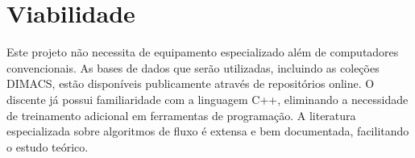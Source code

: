 \documentclass{amsart}
\begin{document}
\section{Viabilidade}
Este projeto não necessita de equipamento especializado além de computadores convencionais. As bases de dados que serão utilizadas, incluindo as coleções DIMACS, estão disponíveis publicamente através de repositórios online. O discente já possui familiaridade com a linguagem C++, eliminando a necessidade de treinamento adicional em ferramentas de programação. A literatura especializada sobre algoritmos de fluxo é extensa e bem documentada, facilitando o estudo teórico.

\newpage


\end{document}
